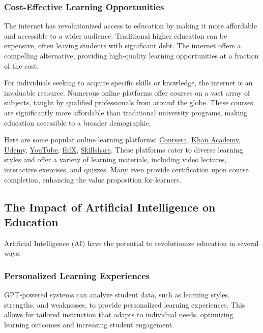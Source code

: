 \documentclass[a4paper,11pt]{article}
\begin{document}
\subsubsection{Cost-Effective Learning Opportunities}

The internet has revolutionized access to education by making it more affordable and accessible to a wider audience. Traditional higher education can be expensive, often leaving students with significant debt. The internet offers a compelling alternative, providing high-quality learning opportunities at a fraction of the cost.

For individuals seeking to acquire specific skills or knowledge, the internet is an invaluable resource. Numerous online platforms offer courses on a vast array of subjects, taught by qualified professionals from around the globe. These courses are significantly more affordable than traditional university programs, making education accessible to a broader demographic.

Here are some popular online learning platforms:
 \href{https://www.coursera.org/}{Coursera}, 
 \href{https://www.khanacademy.org/}{Khan Academy},
 \href{https://www.udemy.com/}{Udemy},
 \href{https://www.youtube.com/}{YouTube},
 \href{https://www.edx.org/}{EdX},
 \href{https://www.skillshare.com/}{Skillshare}. 
These platforms cater to diverse learning styles and offer a variety of learning materials, including video lectures, interactive exercises, and quizzes. Many even provide certification upon course completion, enhancing the value proposition for learners.\cite{role-internet-in-education}

\subsection{The Impact of Artificial Intelligence on Education}

Artificial Intelligence (AI) have the potential to revolutionize education in several ways: \cite{ai-in-education}

\subsubsection{Personalized Learning Experiences}

GPT-powered systems can analyze student data, such as learning styles, strengths, and weaknesses, to provide personalized learning experiences. This allows for tailored instruction that adapts to individual needs, optimizing learning outcomes and increasing student engagement.
\end{document}
